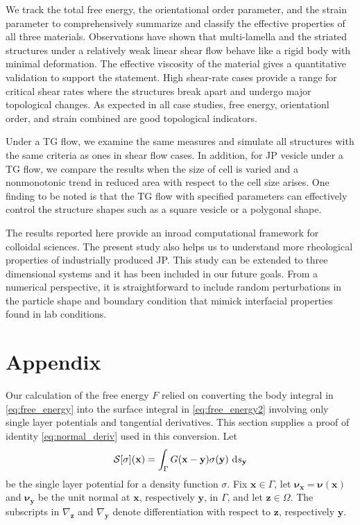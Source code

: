 \documentclass[prb,preprint,showpacs,preprintnumbers,amsmath,amssymb,longbibliography]{revtex4-1}
\newcommand{\nnu}{\boldsymbol{\nu}}
\newcommand{\xx}{\mathbf{x}}
\newcommand{\zz}{\mathbf{z}}
\newcommand{\yy}{\mathbf{y}}
\begin{document}
We track the total free energy, the orientational order parameter,
and the strain parameter to comprehensively summarize and classify the effective properties
of all three materials. 
Observations have shown that multi-lamella and the striated structures under a relatively 
weak linear shear flow behave like a rigid body with minimal deformation. The effective 
viscosity of the material gives a quantitative validation to support the statement. High 
shear-rate cases provide a range for critical shear rates where the structures break 
apart and undergo major topological changes. As expected in all case studies,
free energy, orientationl order, and strain combined 
are good topological indicators.

Under a TG flow, we examine the same measures and simulate all structures with 
the same criteria as ones in shear flow cases. In addition, for JP vesicle under a 
TG flow, we compare the results when the size of cell is varied and a nonmonotonic 
trend in reduced area with respect to the cell size arises. One finding to be noted is 
that the TG flow with specified parameters can effectively control the structure shapes 
such as a square vesicle or a polygonal shape. 

The results reported here provide an inroad computational framework for colloidal sciences. 
The present study also helps us to understand more rheological properties of industrially 
produced JP.
This study can be extended to three dimensional systems 
and it has been included in our future goals\cite{kohl-cor-che-vee22}.
From a numerical perspective,
it is straightforward to include
random perturbations in the particle shape and
boundary condition that mimick interfacial properties
found in lab conditions\cite{Bradley2016,Bradley2017}.

\section{Appendix}
\label{sec:appendix}
Our calculation of the free energy $F$ relied on 
converting the body integral in \eqref{eq:free_energy}
into the surface
integral in \eqref{eq:free_energy2}
involving only single layer potentials and
tangential derivatives. 
This section supplies a proof of identity
\eqref{eq:normal_deriv} used in this conversion.
Let 
\begin{equation}
  \label{eq:SLP}
  \mathcal{S}[\sigma](\xx) = \int_\Gamma G(\xx-\yy) \sigma(\yy)\, \dif s_\yy
\end{equation}
be the single layer potential for a density function $\sigma.$
Fix $\xx \in \Gamma$,
let $\nnu_{\xx} = \nnu(\xx)$ and $\nnu_{\yy}$ be the unit normal at $\xx$, respectively $\yy$, in $\Gamma$,
and let $\zz \in \Omega$.  The subscripts in $\nabla_{\zz}$ and $\nabla_{\yy}$ denote
differentiation with respect to $\zz$, respectively $\yy$.
\end{document}
